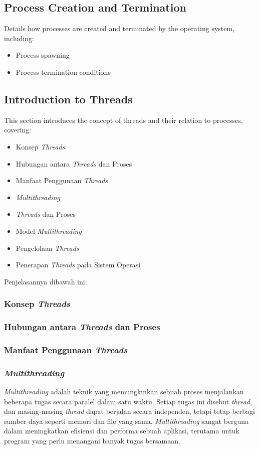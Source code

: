 \documentclass[12pt]{article}
\begin{document}
\subsection{Process Creation and Termination}
Details how processes are created and terminated by the operating system, including:
\begin{itemize}
    \item Process spawning
    \item Process termination conditions
\end{itemize}

\subsection{Introduction to Threads}
This section introduces the concept of threads and their relation to processes, covering:
\begin{itemize}
    \item Konsep \textit{Threads}
    \item Hubungan antara \textit{Threads} dan Proses
    \item Manfaat Penggunaan \textit{Threads}
    \item \textit{Multithreading}
    \item \textit{Threads} dan Proses
    \item Model \textit{Multithreading}
    \item Pengelolaan \textit{Threads}
    \item Penerapan \textit{Threads} pada Sistem Operasi
\end{itemize}
Penjelasannya dibawah ini:
\subsubsection{Konsep \textit{Threads}}
\subsubsection{Hubungan antara \textit{Threads} dan Proses}
\subsubsection{Manfaat Penggunaan \textit{Threads}}
\subsubsection{\textit{Multithreading}}
\textit{Multithreading} adalah teknik yang memungkinkan sebuah proses menjalankan beberapa tugas secara paralel dalam satu waktu. Setiap tugas ini disebut \textit{thread}, dan masing-masing \textit{thread} dapat berjalan secara independen, tetapi tetap berbagi sumber daya seperti memori dan file yang sama. \textit{Multithreading} sangat berguna dalam meningkatkan efisiensi dan performa sebuah aplikasi, terutama untuk program yang perlu menangani banyak tugas bersamaan.
\end{document}
